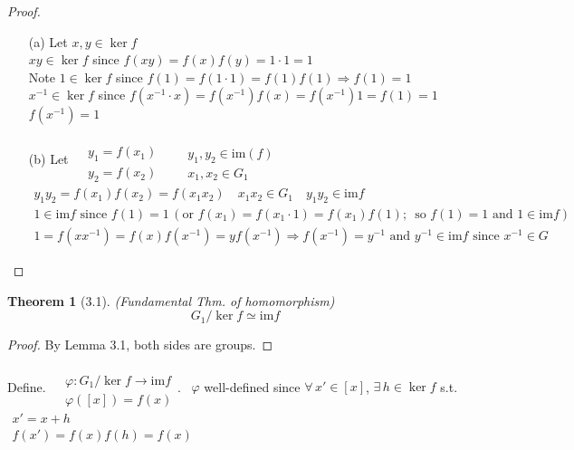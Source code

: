 \documentclass[twoside]{amsart}
\newtheorem{theorem}{Theorem}
\begin{document}
\begin{proof}
\begin{enumerate}
\item[(a)] Let $x,y \in \ker{f}$ \\
$xy \in \ker{f}$ since $f(xy) = f(x) f(y) = 1\cdot 1 = 1$ \\
Note $1 \in \ker{f}$ since $f(1) = f(1\cdot 1 ) = f(1) f(1) \Longrightarrow f(1) = 1$ \\
$x^{-1} \in \ker{f}$ since $f(x^{-1}\cdot x) = f(x^{-1})f(x) = f(x^{-1}) 1 = f(1) = 1$ \, $f(x^{-1})= 1$
\item[(b)] Let $\begin{aligned} & \quad \\ 
  & y_1 = f(x_1) \\ 
  & y_2  = f(x_2) \end{aligned}$ \quad \, $\begin{aligned} & \quad \\ 
  & y_1,y_2 \in \text{im}(f) \\
  & x_1, x_2 \in G_1 \end{aligned}$ \quad \, \\
$\begin{gathered}
  y_1 y_2 = f(x_1) f(x_2) = f(x_1x_2) \quad x_1 x_2 \in G_1 \quad y_1 y_2 \in \text{im}{f} \\
  1 \in \text{im}{f} \text{ since } f(1) = 1 \, (\text{or } f(x_1) = f(x_1 \cdot 1) = f(x_1) f(1); \, \text{ so } f(1) = 1 \text{ and } 1 \in \text{im}{f}) \\ 
  1 = f(xx^{-1}) = f(x) f(x^{-1}) = yf(x^{-1}) \Longrightarrow f(x^{-1}) = y^{-1} \text{ and } y^{-1} \in \text{im}{f} \text{ since } x^{-1} \in G 
\end{gathered}$
\end{enumerate}
\end{proof}

\begin{theorem}[3.1] (Fundamental Thm. of homomorphism) 
\[
G_1/ \ker{f} \simeq \text{im}{f} 
\]
\end{theorem}

\begin{proof} By Lemma 3.1, both sides are groups. \end{proof}

Define.  $\begin{aligned} & \quad \\ 
  & \varphi: G_1/ \ker{f} \to \text{im}{f} \\
  & \varphi([x]) = f(x) \end{aligned}$. \quad \, $\varphi$ well-defined since $\forall \, x' \in [x]$, $\exists \, h \in \ker{f}$ s.t. $ \begin{gathered} x' = x + h \\ 
  f(x') = f(x) f(h) = f(x) \end{gathered}$ \\
\end{document}
